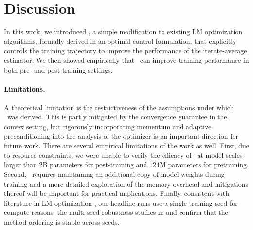 \section{Discussion}\label{sec:discussion}

In this work, we introduced \pace, a simple modification to existing LM optimization algorithms, formally derived in an optimal control formulation, that explicitly controls the training trajectory to improve the performance of the iterate-average estimator.  
We then showed empirically that \pace\ can improve training performance in both pre- and post-training settings.

\paragraph{Limitations.}  A theoretical limitation is the restrictiveness of the assumptions under which \pace\ was derived.  This is partly mitigated by the convergence guarantee in the convex setting, but rigorously incorporating momentum and adaptive preconditioning into the analysis of the optimizer is an important direction for future work.  
\iftoggle{colt}{}{We emphasize that in all experiments, \pace\ is implemented with both momentum and adaptive preconditioning.  }
There are several empirical limitations of the work as well.  First, due to resource constraints, we were unable to verify the efficacy of \pace\ at model scales larger than $2$B parameters for post-training and $124$M parameters for pretraining.  
Second, \pace\ requires maintaining an additional copy of model weights during training and a more detailed exploration of the memory overhead and mitigations thereof will be important for practical implications.  Finally, consistent with literature in LM optimization \citep{vyas2024soap,liu2023sophia,defazio2024schedule}, our headline runs use a single training seed for compute reasons; the multi-seed robustness studies in  and  confirm that the method ordering is stable across seeds.

